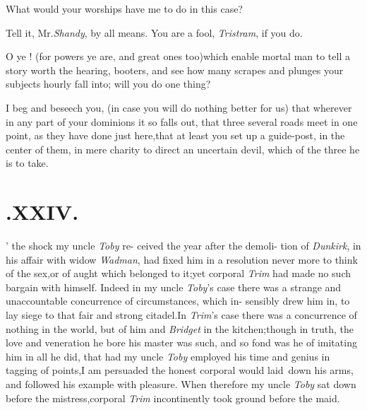 \documentclass{article}
\begin{document}
\tsh What would your worships have me to do in this case?

\tsk Tell it, Mr.\@ \textit{Shandy}, by all means.\break
\tsh You are a fool, \textit{Tristram}, if you do.

O ye ! (for powers ye are, and great ones too)\tsk which
enable mortal man to tell a story worth the
hearing,\break
{}
booters, and see how many scrapes and plunges your
subjects hourly fall into;\tsh\break
will you do one thing?

I beg and beseech you, (in case you
will do nothing better for us) that wherever in any part of your
dominions it so falls out, that three several roads meet in one
point, as they have done just here,\tsk that at least you set up
a guide-post, in the center of them, in mere charity to direct
an uncertain devil, which of the three he is to take.

\section{.\quad  XXIV.}

’ the shock my uncle \textit{Toby} re-\break
ceived the year after the demoli-\break
tion of \textit{Dunkirk}, in his affair with widow \textit{Wadman}, had fixed
him in a resolution never more to think of the sex,\tsk or of
aught which belonged to it;\tsk yet corporal \textit{Trim} had made
no such bargain with himself. Indeed in my uncle
\textit{Toby}’s case there was a strange and unaccountable
concurrence of circumstances, which in- sensibly drew him in, to lay
siege to that fair and strong citadel.\tsh In
\textit{Trim}’s case there was a concurrence of nothing in the
world, but of him and \textit{Bridget} in the kitchen;\tsk though
in truth, the love and veneration he bore his master was such, and
so fond was he of imitating him in all he did, that had my uncle \textit{Toby}
employed his time and genius in tagging of points,\tsh I am
persuaded the honest corporal would laid\sic\ down his arms, and
followed his example with pleasure. When therefore my uncle
\textit{Toby} sat down before the mistress,\tsk corporal \textit{Trim}
incontinently took ground before the maid.
\end{document}
